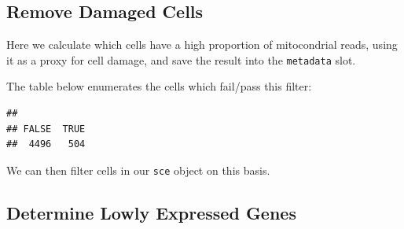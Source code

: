 \documentclass[]{book}
\newenvironment{Shaded}{\begin{snugshade}}{\end{snugshade}}
\newcommand{\DataTypeTok}[1]{\textcolor[rgb]{0.13,0.29,0.53}{#1}}
\newcommand{\DecValTok}[1]{\textcolor[rgb]{0.00,0.00,0.81}{#1}}
\newcommand{\KeywordTok}[1]{\textcolor[rgb]{0.13,0.29,0.53}{\textbf{#1}}}
\newcommand{\NormalTok}[1]{#1}
\newcommand{\OperatorTok}[1]{\textcolor[rgb]{0.81,0.36,0.00}{\textbf{#1}}}
\newcommand{\StringTok}[1]{\textcolor[rgb]{0.31,0.60,0.02}{#1}}
\begin{document}
\hypertarget{remove-damaged-cells}{%
\subsection{Remove Damaged Cells}\label{remove-damaged-cells}}

Here we calculate which cells have a high proportion of mitocondrial reads, using it as a proxy for cell damage, and save the result into the \texttt{metadata} slot.

\begin{Shaded}
\end{Shaded}

The table below enumerates the cells which fail/pass this filter:

\begin{Shaded}
\end{Shaded}

\begin{verbatim}
## 
## FALSE  TRUE 
##  4496   504
\end{verbatim}

We can then filter cells in our \texttt{sce} object on this basis.

\begin{Shaded}
\end{Shaded}

\hypertarget{determine-lowly-expressed-genes}{%
\subsection{Determine Lowly Expressed Genes}\label{determine-lowly-expressed-genes}}
\end{document}
